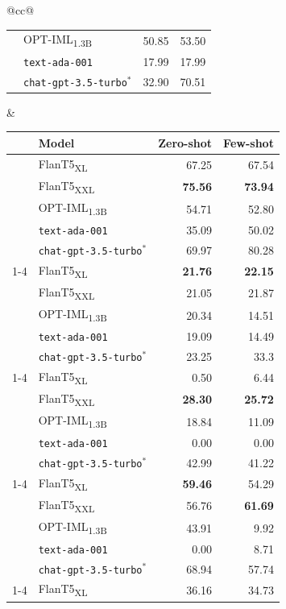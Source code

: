 \begin{table}[t]
{\begin{tabular}{@{}cc@{}}
\begin{tabular}{llrr}
 & OPT-IML\textsubscript{1.3B} & 50.85 & 53.50 \\
 & \texttt{text-ada-001} & 17.99 & 17.99 \\
 & \texttt{chat-gpt-3.5-turbo$^*$} & 32.90 & 70.51 \\
\end{tabular}
&
\begin{tabular}{llrr} \toprule
 & Model & Zero-shot & Few-shot \\ \midrule
\multirow[c]{5}{*}{\rotatebox{90}{\TweetNERD}} & FlanT5\textsubscript{XL} & 67.25 & 67.54 \\
 & FlanT5\textsubscript{XXL} & \textbf{75.56} & \textbf{73.94} \\
 & OPT-IML\textsubscript{1.3B} & 54.71 & 52.80 \\
 & \texttt{text-ada-001} & 35.09 & 50.02 \\
 & \texttt{chat-gpt-3.5-turbo$^*$} & 69.97 & 80.28 \\
\cmidrule{1-4}
\multirow[c]{5}{*}{\rotatebox{90}{\TweetQG}} & FlanT5\textsubscript{XL} & \textbf{21.76} & \textbf{22.15} \\
 & FlanT5\textsubscript{XXL} & 21.05 & 21.87 \\
 & OPT-IML\textsubscript{1.3B} & 20.34 & 14.51 \\
 & \texttt{text-ada-001} & 19.09 & 14.49 \\
 & \texttt{chat-gpt-3.5-turbo$^*$} & 23.25 & 33.3 \\
\cmidrule{1-4}
\multirow[c]{5}{*}{\rotatebox{90}{\textsc{TweetSent.}}} & FlanT5\textsubscript{XL} & 0.50 & 6.44 \\
 & FlanT5\textsubscript{XXL} & \textbf{28.30} & \textbf{25.72} \\
 & OPT-IML\textsubscript{1.3B} & 18.84 & 11.09 \\
 & \texttt{text-ada-001} & 0.00 & 0.00 \\
 & \texttt{chat-gpt-3.5-turbo$^*$} & 42.99 & 41.22 \\
\cmidrule{1-4}
\multirow[c]{5}{*}{\rotatebox{90}{\TweetSimilarity}} & FlanT5\textsubscript{XL} & \textbf{59.46} & 54.29 \\
 & FlanT5\textsubscript{XXL} & 56.76 & \textbf{61.69} \\
 & OPT-IML\textsubscript{1.3B} & 43.91 & 9.92 \\
 & \texttt{text-ada-001} & 0.00 & 8.71 \\
 & \texttt{chat-gpt-3.5-turbo$^*$} & 68.94 & 57.74 \\
\cmidrule{1-4}
\multirow[c]{5}{*}{\rotatebox{90}{\TweetTopic}} & FlanT5\textsubscript{XL} & 36.16 & 34.73 \\

\end{tabular}
\end{tabular}}
\end{table}
